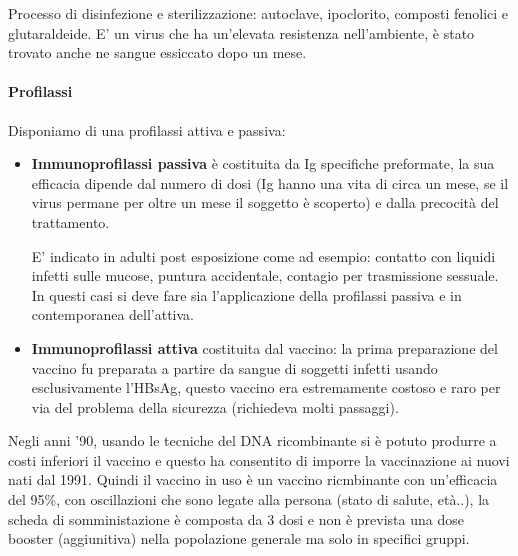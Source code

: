   Processo di disinfezione e sterilizzazione: autoclave, ipoclorito,
  composti fenolici e glutaraldeide. E' un virus che ha un'elevata
  resistenza nell'ambiente, è stato trovato anche ne sangue essiccato
  dopo un mese.

\paragraph{Profilassi}

  Disponiamo di una profilassi attiva e passiva:

\begin{itemize}
\item
  \textbf{Immunoprofilassi passiva} è costituita da Ig specifiche
  preformate, la sua efficacia dipende dal numero di dosi (Ig hanno una
  vita di circa un mese, se il virus permane per oltre un mese il
  soggetto è scoperto) e dalla precocità del trattamento.

  E' indicato in adulti post esposizione come ad esempio: contatto con
  liquidi infetti sulle mucose, puntura accidentale, contagio per
  trasmissione sessuale. In questi casi si deve fare sia l'applicazione
  della profilassi passiva e in contemporanea dell'attiva.
\item
  \textbf{Immunoprofilassi attiva} costituita dal vaccino: la prima
  preparazione del vaccino fu preparata a partire da sangue di soggetti
  infetti usando esclusivamente l'HBsAg, questo vaccino era estremamente
  costoso e raro per via del problema della sicurezza (richiedeva molti
  passaggi).
\end{itemize}
  Negli anni '90, usando le tecniche del DNA ricombinante si è potuto
  produrre a costi inferiori il vaccino e questo ha consentito di
  imporre la vaccinazione ai nuovi nati dal 1991. Quindi il vaccino in
  uso è un vaccino ricmbinante con un'efficacia del 95\%, con
  oscillazioni che sono legate alla persona (stato di salute, età..), la
  scheda di somministazione è composta da 3 dosi e non è prevista una
  dose booster (aggiunitiva) nella popolazione generale ma solo in
  specifici gruppi.

